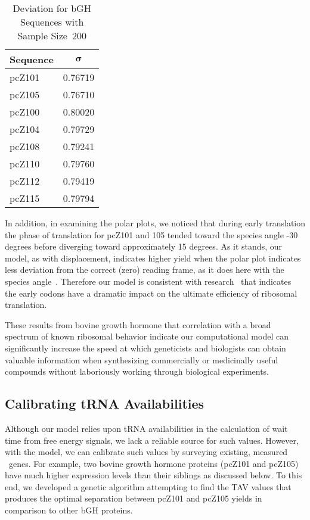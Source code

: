 \documentclass[12pt, draft]{article}
\numberwithin{equation}{section}
\begin{document}
\begin{table}[tbp]
\begin{center}
    \begin{tabular}{lc}
        \toprule
        \textbf{Sequence} & $\mathbf{\sigma}$\\
        \midrule
        pcZ101 & 0.76719\\
        pcZ105 & 0.76710\\
        \midrule
        pcZ100 & 0.80020\\
        pcZ104 & 0.79729\\
        pcZ108 & 0.79241\\
        pcZ110 & 0.79760\\
        pcZ112 & 0.79419\\
        pcZ115 & 0.79794\\
        \bottomrule
    \end{tabular}
    \caption{Deviation for bGH Sequences with Sample Size~200}
    \label{bgh:deviation}
\end{center}
\end{table}

In addition, in examining the polar plots, we noticed that during
early translation the phase of translation for pcZ101 and 105 tended toward the species
angle -30 degrees before diverging toward approximately 15 degrees. As
it stands, our model, as with displacement, indicates higher yield when the polar plot
indicates less deviation from the correct (zero) reading frame, as it
does here with the species angle~\cite{lalit:mechanics}. Therefore our
model is consistent with research~\cite{bgh:initiation} that indicates
the early codons have a dramatic impact on the ultimate efficiency of
ribosomal translation.

These results from bovine growth hormone that correlation with a broad
spectrum of known ribosomal behavior indicate our computational model
can significantly increase the speed at which geneticists and
biologists can obtain valuable information when synthesizing
commercially or medicinally useful compounds without laboriously
working through biological experiments.

\subsection{Calibrating tRNA Availabilities}
Although our model relies upon tRNA availabilities in the calculation of
wait time from free energy signals, we lack a reliable source for such
values. However, with the model, we can calibrate such values by
surveying existing, measured \ecoli\ genes. For example, two bovine growth
hormone proteins (pcZ101 and pcZ105)  have much higher expression
levels than their siblings as discussed below. To this end, we
developed a genetic algorithm attempting to find the TAV values that
produces the optimal separation between pcZ101 and pcZ105 yields in
comparison to other bGH proteins.
\end{document}

